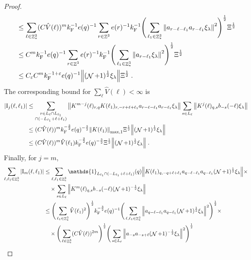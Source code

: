 \documentclass[12pt,a4paper]{article}
\numberwithin{equation}{section}
\newcommand{\1}{\mathbb{I}}
\newcommand{\F}{\mathrm{F}}
\newcommand{\I}{\mathrm{I}}
\DeclareMathOperator{\Z}{\mathbb{Z}}
\DeclareMathOperator{\NN}{\mathcal{N}}
\newcommand{\half}{\frac{1}{2}}
\theoremstyle{plain}
\theoremstyle{definition}
\theoremstyle{remark}
\theoremstyle{plain}
\theoremstyle{definition}
\theoremstyle{remark}
\begin{document}
\begin{proof}
{\begin{align}
	&\leq \sum_{\ell \in \Z^3_*} (C \hat{V}(\ell))^m k_{\F}^{-1} e(q)^{-1}
		\sum_{r \in \Z^3} e(r)^{-1} k_{\F}^{-1}
		\Bigg( \sum_{\ell_1 \in \Z^3_*} \norm{ a_{r-\ell-\ell_1} a_{r-\ell_1} \xi_\lambda}^2 \Bigg)^{\half}
		\Xi^\half \nonumber\\
	&\leq C^m k_{\F}^{-1} e(q)^{-1}
		\sum_{r \in \Z^3} e(r)^{-1} k_{\F}^{-1}
		\Bigg( \sum_{\ell_1 \in \Z^3_*} \norm{ a_{r-\ell_1} \xi_\lambda}^2 \Bigg)^{\half}
		\Xi^\half \nonumber\\
	&\leq C_\varepsilon C^m k_{\F}^{-1+\varepsilon} e(q)^{-1}
		\norm{ (\NN+1)^{\half} \xi_\lambda}
		\Xi^\half \;. \label{eq:estEQ2152_Coulomb}
\end{align}
The corresponding bound for $ \sum_\ell \hat{V}(\ell) < \infty $ is}
\begin{align}
	|\I_j(\ell, \ell_1)|
	&\leq \sum\limits_{\substack{r\in L_{\ell} \cap L_{\ell_1}\\ \cap (-L_{\ell_1}+\ell+\ell_1)}}
		\norm{ K^{m-j}(\ell)_{r,q} K(\ell_1)_{r,-r+\ell+\ell_1} a_{r-\ell-\ell_1} a_{r-\ell_1} \xi_\lambda}
		\sum\limits_{s \in L_{\ell}}
		\norm{ K^j(\ell)_{q,s} b_{-s}(-\ell) \xi_\lambda }\nonumber\\
	&\leq (C \hat{V}(\ell))^m k_{\F}^{-\frac 32} e(q)^{-\frac 32}
		\norm{K(\ell_1)}_{\max,1} \Xi^{\half}
		\norm{ (\NN+1)^\half \xi_\lambda} \nonumber\\
	&\leq (C \hat{V}(\ell))^m
		\hat{V}(\ell_1)
		k_{\F}^{-\frac 32} e(q)^{-\frac 32} \Xi^\half
		\norm{ (\NN+1)^\half \xi_\lambda} \;. \label{eq:estEQ2152}
\end{align}
Finally, for $ j = m $,
\textcolor{green!30!black}{
\begin{align}
	\sum_{\ell,\ell_1 \in \Z^3_*} |\I_m(\ell, \ell_1)|
	&\leq \sum_{\ell,\ell_1 \in \Z^3_*} \mathds{1}_{L_{\ell_1} \cap (-L_{\ell_1} + \ell + \ell_1)}(q) \norm{K(\ell_1)_{q,-q+\ell+\ell_1} a_{q-\ell-\ell_1} a_{q-\ell_1} (\NN+1)^{\half} \xi_\lambda} \times \nonumber\\
	&\quad \times \sum\limits_{ s \in L_{\ell}}
		\norm{ K^m(\ell)_{q,s} b_{-s}(-\ell) (\NN+1)^{-\half} \xi_\lambda }\nonumber\\
	&\leq \Bigg( \sum_{\ell_1 \in \Z^3_*} \hat{V}(\ell_1)^2 \Bigg)^{\half} 
		k_{\F}^{-\frac 32} e(q)^{-1}
		\Bigg( \sum_{\ell,\ell_1 \in \Z^3_*} \norm{a_{q-\ell-\ell_1} a_{q-\ell_1} (\NN+1)^{\half} \xi_\lambda}^2 \Bigg)^{\half} \times \nonumber\\
	&\quad \times \Bigg( \sum_{\ell \in \Z^3_*} (C \hat{V}(\ell))^{2m} \Bigg)^{\half} 
		\Bigg( \sum\limits_{ s \in L_{\ell}} \norm{ a_{-s} a_{-s+\ell} (\NN+1)^{-\half} \xi_\lambda }^2 \Bigg)^{\half} \nonumber\\

\end{align}}
\end{proof}
\end{document}
